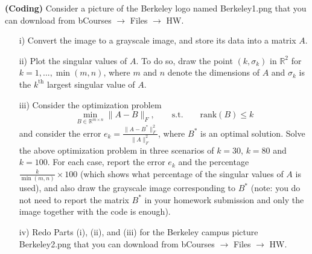 \begin{homeworkProblem}

    \textbf{(Coding)} Consider a picture of the Berkeley logo named 
    Berkeley1.png that you can download from bCourses $\rightarrow$ Files 
    $\rightarrow$ HW.
    \begin{itemize}
        \item [i)] Convert the image to a grayscale image, and store its data 
        into a matrix $A$.
        \item [ii)] Plot the singular values of $A$. To do so, draw the point 
        $(k,\sigma_k)$ in $\mathbb R^2$ for $k=1,...,\min(m,n)$, where $m$ and 
        $n$ denote the dimensions of $A$ and $\sigma_k$ is the $k^{\text{th}}$ 
        largest singular value of $A$.
        \item [iii)] Consider the optimization problem
        \begin{equation}
            \min_{B\in\mathbb R^{m\times n}}\|A-B\|_F,\qquad \text{s.t.}\qquad 
            \text{rank}(B)\leq k
        \end{equation}
        and consider the error $e_k=\frac{\|A-B^*\|_F^2}{\|A\|_F^2}$, where 
        $B^*$ is an optimal solution. Solve the above optimization problem in 
        three scenarios of $k=30$, $k=80$ and $k=100$. For each case, report 
        the error $e_k$ and the percentage $\frac{k}{\min(m,n)}\times 100$ 
        (which shows what percentage of the singular values of $A$ is used), 
        and also draw the grayscale image corresponding to $B^*$ (note: you do 
        not need to report the matrix $B^*$ in your homework submission and 
        only the image together with the code is enough).

        \item [iv)] Redo Parts (i), (ii), and (iii) for the Berkeley campus 
        picture Berkeley2.png that you can download from bCourses 
        $\rightarrow$ Files $\rightarrow$ HW.
    \end{itemize}

\end{homeworkProblem}